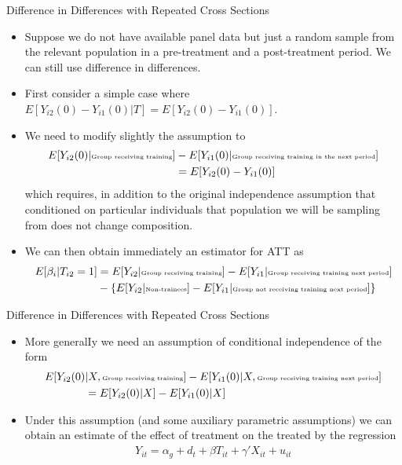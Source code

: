 \documentclass[xcolor=pdftex,dvipsnames,table,mathserif,aspectratio=169]{beamer}
\begin{document}
\begin{frame}{Difference in Differences with Repeated Cross Sections}
\small
\begin{itemize}
\item Suppose we do not have available panel data but just a random sample from the relevant population in a pre-treatment and a post-treatment period. We can still use difference in differences.
\item First consider a simple case where {\small $E[Y_{i2}(0)- Y_{i1}(0) | T] = E[Y_{i2}(0)- Y_{i1}(0)]$}.
\item We need to modify slightly the assumption to
\vspace{-.5pc}
\begin{align*}
E[Y_{i2}(0) | \text{\tiny Group receiving training}]&-E[Y_{i1}(0) | \text{\tiny Group receiving training in the next period}] \\
&= E[Y_{i2}(0)-Y_{i1}(0)]  
\end{align*}
which requires, in addition to the original independence
assumption that conditioned on particular individuals that population we will be sampling from does not change composition.
\item We can then obtain immediately an estimator for ATT as
\begin{align*}
E[\beta_i |T_{i2}=1] 
&= E[Y_{i2}| \text{\tiny Group receiving training}]-E[Y_{i1}| \text{\tiny Group receiving training next period}] \\
&- \{E[Y_{i2} | \text{\tiny Non-trainees}] - E[Y_{i1} | \text{\tiny Group not receiving training next period}]\}
\end{align*}
\end{itemize}
\end{frame}


\begin{frame}{Difference in Differences with Repeated Cross Sections}
\begin{itemize}
\item More generalIy we need an assumption of conditional independence of the form
\begin{align*}
E[Y_{i2}(0) & | X, \text{\tiny Group receiving training}]-E[Y_{i1}(0) | X, \text{\tiny Group receiving training next period}] \\
&= E[Y_{i2}(0) | X] - E[Y_{i1}(0) |X]
\end{align*}
\item Under this assumption (and some auxiliary parametric assumptions) we can obtain an estimate of the effect of treatment on the treated by the regression
\begin{align*}
Y_{it} = \alpha_g + d_t + \beta T_{it} + \gamma' X_{it} + u_{it}
\end{align*} 
\end{itemize}
\end{frame}
\end{document}
